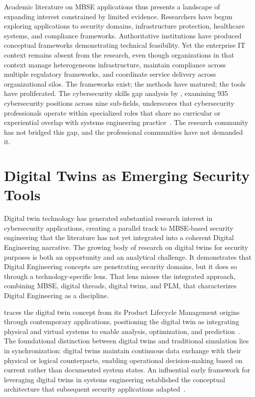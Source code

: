 Academic literature on MBSE applications thus presents a landscape of expanding interest constrained by limited evidence. Researchers have begun exploring applications to security domains, infrastructure protection, healthcare systems, and compliance frameworks. Authoritative institutions have produced conceptual frameworks demonstrating technical feasibility. Yet the enterprise IT context remains absent from the research, even though organizations in that context manage heterogeneous infrastructure, maintain compliance across multiple regulatory frameworks, and coordinate service delivery across organizational silos. The frameworks exist; the methods have matured; the tools have proliferated. The cybersecurity skills gap analysis by \citeauthor{Ramezan_2023}, examining 935 cybersecurity positions across nine sub-fields, underscores that cybersecurity professionals operate within specialized roles that share no curricular or experiential overlap with systems engineering practice~\parencite{Ramezan_2023}. The research community has not bridged this gap, and the professional communities have not demanded it.

\section{Digital Twins as Emerging Security Tools}

Digital twin technology has generated substantial research interest in cybersecurity applications, creating a parallel track to MBSE-based security engineering that the literature has not yet integrated into a coherent Digital Engineering narrative. The growing body of research on digital twins for security purposes is both an opportunity and an analytical challenge. It demonstrates that Digital Engineering concepts are penetrating security domains, but it does so through a technology-specific lens. That lens misses the integrated approach, combining MBSE, digital threads, digital twins, and PLM, that characterizes Digital Engineering as a discipline.

\citeauthor{Grieves_2023} traces the digital twin concept from its Product Lifecycle Management origins through contemporary applications, positioning the digital twin as integrating physical and virtual systems to enable analysis, optimization, and prediction~\parencite{Grieves_2023}. The foundational distinction between digital twins and traditional simulation lies in synchronization: digital twins maintain continuous data exchange with their physical or logical counterparts, enabling operational decision-making based on current rather than documented system states. An influential early framework for leveraging digital twins in systems engineering established the conceptual architecture that subsequent security applications adapted~\parencite{madni2018leveraging}.

